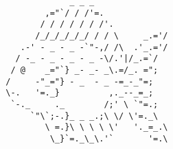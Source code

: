 \documentclass{article}
\begin{document}
\vfill
\centering
\small
\begin{BVerbatim}
                     _ _ _
                ,="`/ / /'=.
               / / / / / / /'.
              /_/_/_/_/_/ / / \     _.='/
           .-' - _ - _ -`"-,/ /\  .'_.='/
          / -_ - _ - _ - _ -\/.'|/_.=`/
         / @    _="`} _- _- _\.=/_. =";
        /     -"_="} - _  - _ -=_-_"=;
        \-.   '=._}          ,._--_=_;
         `-._     ._        /;' \ `"=.;
             `"\`;-.}_ _ _.;\ \/ \'=._\
                \ =.}\ \ \ \ \'   '._=_.\
                 \_}`=._\_\.'`       '=.\
\end{BVerbatim}
\end{document}

